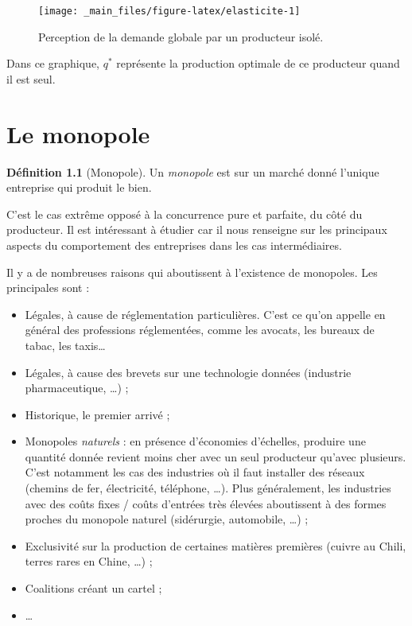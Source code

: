 \documentclass[
]{book}
\providecommand{\tightlist}{%
  \setlength{\itemsep}{0pt}\setlength{\parskip}{0pt}}
\theoremstyle{definition}
\newtheorem{definition}{Définition}[chapter]
\theoremstyle{definition}
\theoremstyle{definition}
\theoremstyle{definition}
\theoremstyle{remark}
\begin{document}
\begin{figure}

{\centering \texttt{[image: \_main\_files/figure-latex/elasticite-1]} 

}

\caption{Perception de la demande globale par un producteur isolé.}\label{fig:elasticite}
\end{figure}

Dans ce graphique, \(q^*\) représente la production optimale de ce producteur quand il est seul.

\hypertarget{le-monopole}{%
\chapter{Le monopole}\label{le-monopole}}

\begin{definition}[Monopole]
Un \emph{monopole} est sur un marché donné l'unique entreprise qui produit le bien.
\end{definition}

C'est le cas extrême opposé à la concurrence pure et parfaite, du côté du producteur.
Il est intéressant à étudier car il nous renseigne sur les principaux aspects du comportement des entreprises dans les cas intermédiaires.

Il y a de nombreuses raisons qui aboutissent à l'existence de monopoles.
Les principales sont :

\begin{itemize}
\tightlist
\item
  Légales, à cause de réglementation particulières.
  C'est ce qu'on appelle en général des professions réglementées, comme les avocats, les bureaux de tabac, les taxis\ldots{}
\item
  Légales, à cause des brevets sur une technologie données (industrie pharmaceutique, \ldots) ;
\item
  Historique, le premier arrivé ;
\item
  Monopoles \emph{naturels} : en présence d'économies d'échelles, produire une quantité donnée revient moins cher avec un seul producteur qu'avec plusieurs.
  C'est notamment les cas des industries où il faut installer des réseaux (chemins de fer, électricité, téléphone, \ldots).
  Plus généralement, les industries avec des coûts fixes / coûts d'entrées très élevées aboutissent à des formes proches du monopole naturel (sidérurgie, automobile, \ldots) ;
\item
  Exclusivité sur la production de certaines matières premières (cuivre au Chili, terres rares en Chine, \ldots) ;
\item
  Coalitions créant un cartel ;
\item
  \ldots{}
\end{itemize}
\end{document}
